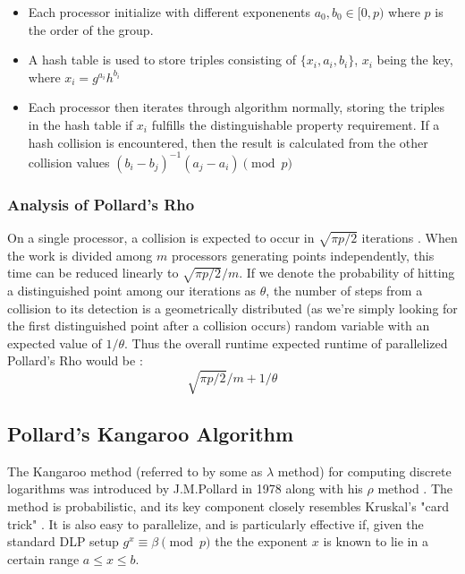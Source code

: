 \documentclass{article}
\begin{document}
      \begin{itemize}

        \item Each processor initialize with different exponenents $a_0, b_0 \in [0, p)$ where $p$ is the order of the group.

          \item A hash table is used to store triples consisting of $\{x_i, a_i, b_i\}$, $x_i$ being the key, where $x_i = g^{a_i}h^{b_i}$

          \item Each processor then iterates through algorithm normally, storing the triples in the hash table if $x_i$ fulfills the distinguishable property requirement.  If a hash collision is encountered, then the result is calculated from the other collision values $(b_i-b_j)^{-1}(a_j-a_i)\pmod p$

        \end{itemize}

        \subsubsection{Analysis of Pollard's Rho}

        On a single processor, a collision is expected to occur in $\sqrt{\pi p/2}$ iterations \autocite{BaiBrent2008}.  When the work is divided among $m$ processors generating points independently, this time can be reduced linearly to $\sqrt{\pi p/2}/m$.  If we denote the probability of hitting a distinguished point among our iterations as $\theta$, the number of steps from a collision to its detection is a geometrically distributed (as we're simply looking for the first distinguished point after a collision occurs) random variable with an expected value of $1/\theta$.  Thus the overall runtime expected runtime of parallelized Pollard's Rho would be \autocite{OorschotWiener1999}: \\
        $$\sqrt{\pi p/2}/m + 1/\theta$$

        \subsection{Pollard's Kangaroo Algorithm}

        The Kangaroo method (referred to by some as $\lambda$ method) for computing discrete logarithms was introduced by J.M.Pollard in 1978 along with his $\rho$ method \autocite{Pollard1978}. The method is probabilistic, and its key component closely resembles Kruskal's "card trick" \autocite{Gardner1970}. It is also easy to parallelize, and is particularly effective if, given the standard DLP setup $g^x \equiv \beta \pmod{p}$ the the exponent $x$ is known to lie in a certain range $a \leq x \leq b$.
\end{document}
